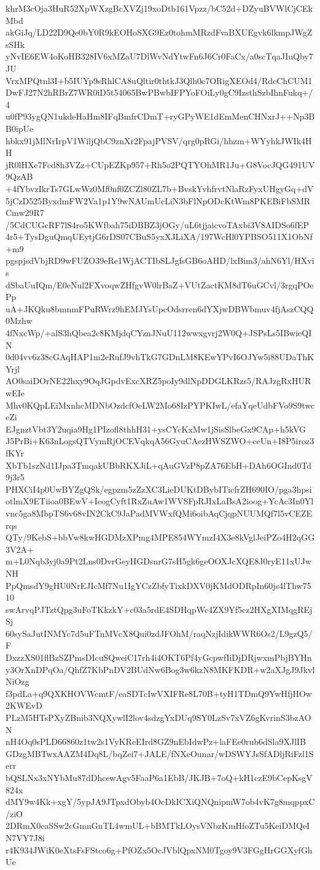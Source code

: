 khrM3cOja3HuR52XpWXzgBcXVZj19xoDtb161Vpzz/bC52d+DZyuBVWlCjCEkMbd
akGiJq/LD22D9Qe0bY0R9kEOHoSXG9Ez0tohmMRzdFvaBXUEgvk6lkmpJWgZsSHk
yNvIE6EW4oKoHB328IV6xMZaU7DlWvNdYtwFn6J6Cr0FaCx/a0scTqaJIuQby7JU
VrxMPQtnl3I+b5IUYp9sRhlCA8uQltir0thtkJ3Qlh0c7ORigXEOd4/RdcChCUM1
DwFJ27N2hRBrZ7WR0iD5t54065BwPBwbIFPYoFOiLy0gC9IzsthSzbIhnFukq+/4
u0fP93ygQN1ukdeHaHm8IFqBmfrCDmT+ryGPyWE1dEmMenCHNxrJ++Np3BB0ipUe
hbkx91jMlNrIrpV1WiljQbC9znXr2FpajPVSV/qrg0pRGi/hhzm+WYyhkJWIk4HH
jR0lHXe7Fcd8h3VZz+CUpEZKp957+Rh5o2PQTYOhMR1Ju+G8VocJQG491UV9QzAB
+4fYbvzIkrTs7GLwWz0Mf0nf0ZCZl80ZL7b+BvskYvhfrvtNlaRzFyxUHgyGq+dV
5jCzD525ByxdmFW2Va1p1Y9wNAUmUcLiN3bFlNpODcKtWm8PKEBiFbSMRCmw29R7
/5CdCUGcRF7lS4ro5KWfbah75iDBBZ3jOGy/uL6tjjaicvoTAxbi3V8AIDSo6fEP
4r5+TysDguQmqUEytjG6rDS07CBuS5yxXJLiXA/197WcHl0YPBSO511X1ObNf+m9
pgspjsdVbjRD9wFUZO39eRe1WjACTIbSLJgfsGB6oAHD/lxBim3/ahN6Yl/HXvis
dSbaUuIQm/E0eNul2FXvoqwZHfgvW0lrBaZ+VUtZactKM8dT6uGCvl/3rgqPOePp
uA+JKQku8bmnmFPuRWrz9hEMJYsUpcOdsrren6dYXjwDBWbmuv4fjAszCQQ0Mzhw
4fNxcWp/+alS3hQbea2c8KMjdqCYznJNuU112wwxgvrj2W0Q+JSPsLs5IBwieQIN
0d04vv6z38cGAqHAP1m2eRufJ9vhTkG7GDnLM8KEwYPvI6OJYw5i88UDaThKYrjl
AO0saiDOrNE22hxy9OqJGpdvExcXRZ5poIy9dlNpDDGLKRzs5/RAJzgRxHURwEIe
Mhv0KQpLEiMxnhcMDNbOzdcfOeLW2Mo68IzPYPKIwL/efaYqeUdbFVo9S9twceZi
EJgnztVbt3Y2uqia9Hg1PIzofl8thhH31+ysCYcKxMw1jSisSlbeGx9CAp+h5kVG
J5PrBi+K63nLogsQTVymRjOCEVqkqA56GyuCAezHWSZWO+ceUn+I8P5iroz3fKYr
XbTb1szNd1IJpa3TmqakUBbRKXJiL+qAuGVzP8pZA76EbH+DAh6OGInd0Td9j3r5
PHXCiI4p0UwBYZgQSk/egpzm5zZzXC3LieDUKtDBybITicfrZH690IO/pga3hpsi
otlmX9ETiioa0BEwV+IeogCyft1RxZuAw1WVSFpRJIxLaBsA2ioog+YcAc3In0Yl
vnc5ga8MbpTS6v68vIN2CkC9JaPadMVWxfQMi6oibAqCjqpNUUMQf7l5vCEZErqs
QTy/9KebS+bbVw8kwHGDMzXPmg4MPE854WYmzI4X3e8kVglJeiPZo4H2qGG3V2A+
m+L0Nqb3yj0a9Pt2Lns0DvrGeyHGDsnrG7sH5gk6geOOXJcXQE8J0ryE11xUJwNH
PpQmsdY9gHU0NrEJIcMf7Nu1IgYCzZbfyTixkDXV0jKMdODRpIn60js4lThw7510
swArvqPJTztQpg3uFoTKkzkY+c03a5rdE4SDHqpWc4ZX9Yf5cz2HXgXIMqgREjSj
60sySaJutINMYc7d5uFTnMVcX8Qui0zdJFOhM/raqNzjIdikWWR6Os2/L9gzQ5/F
DxzzXS01flBzSZPmsDIcuSQweiC17rh4i4OKT6Pf4yGcpwfIiDjDRjwxmPbjBYHn
y3OrXnDPqOa/QhfZ7KbPnDV2BUdNw6Bog3w6kzN8MKFKDR+w2aXJgJ9JkvlNiOzg
f3pdLa+q9QXKHOVWcmtF/eaSDTcIwVXIFRe8L70B+tyH1TDmQ9YwHfjHOw2KWEvD
PLzM5HTsPXyZBnib3NQXywlI2lov4sdzgYxDUq9SY0LzSv7xVZ6gKvrinS3bzAON
nH4Oq0sPLD66860z1tw2s1VyKReEIrd8GZ9nEbIdwPz+laFEe0rub6dSla9XJlIB
GDzgMBTwxAAZM4Dq8L/bqZei7+JALE/fNXeOunar/wDSWYJsSfADljRiFzl1Serr
bQSLNx3xNYbMu87dDhcewAgv5FaaP6a1EbB/JKJB+7oQ+kH1czE9bCepKsgV824x
dMY9w4Kk+xgY/5ypJA9JTpxdObyb4OcDkICXiQNQnipmW7ob4vK7g8mqppxC/ziO
2DRmX0caSSw2cGmnGnTL4wmUL+bBMTkLOysVNbzKmHfoZTu5KeiDMQeIN7VY7J8i
r4K934JWiK0eXtsFsFStco6g+PfOZx5OcJVblQpxNM0Tgoy9V3FGgHrGGXyfGhUe
